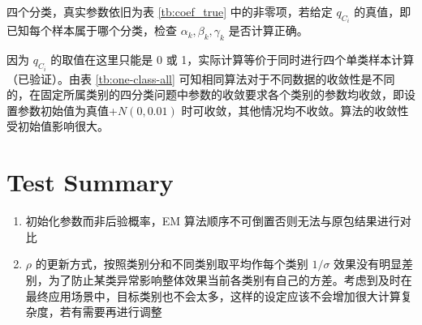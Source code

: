 \documentclass[12pt, a4paper, oneside]{article}
\numberwithin{equation}{section}
\begin{document}
四个分类，真实参数依旧为表 \ref{tb:coef_true} 中的非零项，若给定 $q_{C_i}$ 的真值，即已知每个样本属于哪个分类，检查 $\alpha_k, \beta_k, \gamma_k$ 是否计算正确。

因为 $q_{C_i}$ 的取值在这里只能是 0 或 1，实际计算等价于同时进行四个单类样本计算（已验证）。由表 \ref{tb:one-class-all} 可知相同算法对于不同数据的收敛性是不同的，在固定所属类别的四分类问题中参数的收敛要求各个类别的参数均收敛，即设置参数初始值为真值+$N(0,0.01)$ 时可收敛，其他情况均不收敛。算法的收敛性受初始值影响很大。











\clearpage

\section{Test Summary}

\begin{enumerate}
	\item 初始化参数而非后验概率，EM 算法顺序不可倒置否则无法与原包结果进行对比
	\item $\rho$ 的更新方式，按照类别分和不同类别取平均作每个类别 $1/\sigma$ 效果没有明显差别，为了防止某类异常影响整体效果当前各类别有自己的方差。考虑到及时在最终应用场景中，目标类别也不会太多，这样的设定应该不会增加很大计算复杂度，若有需要再进行调整
\end{enumerate}



\newpage


\end{document}
